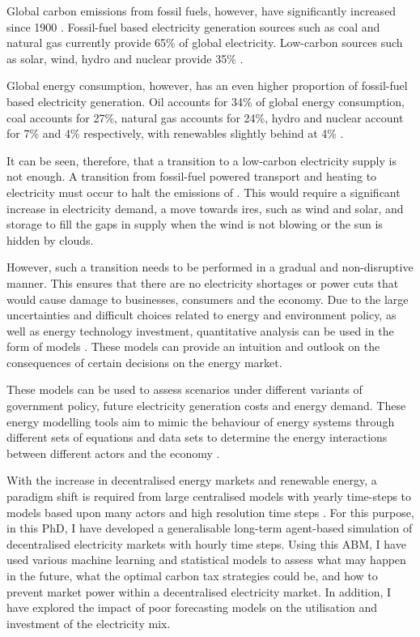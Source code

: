 Global carbon emissions from fossil fuels, however, have significantly increased since 1900 \cite{boden2017global}.    Fossil-fuel based electricity generation sources such as coal and natural gas currently provide 65\% of global electricity. Low-carbon sources such as solar, wind, hydro and nuclear provide 35\% \cite{BP2018}. 

Global energy consumption, however, has an even higher proportion of fossil-fuel based electricity generation. Oil accounts for 34\% of global energy consumption, coal accounts for 27\%, natural gas accounts for 24\%, hydro and nuclear account for 7\% and 4\% respectively, with renewables slightly behind at 4\% \cite{BPReview}. 

It can be seen, therefore, that a transition to a low-carbon electricity supply is not enough. A transition from fossil-fuel powered transport and heating to electricity must occur to halt the emissions of . This would require a significant increase in electricity demand, a move towards \gls{ires}, such as wind and solar, and storage to fill the gaps in supply when the wind is not blowing or the sun is hidden by clouds. 

However, such a transition needs to be performed in a gradual and non-disruptive manner. This ensures that there are no electricity shortages or power cuts that would cause damage to businesses, consumers and the economy. Due to the large uncertainties and difficult choices related to energy and environment policy, as well as energy technology investment, quantitative analysis can be used in the form of models \cite{DeCarolis2012}. These models can provide an intuition and outlook on the consequences of certain decisions on the energy market.

These models can be used to assess scenarios under different variants of government policy, future electricity generation costs and energy demand. These energy modelling tools aim to mimic the behaviour of energy systems through different sets of equations and data sets to determine the energy interactions between different actors and the economy \cite{Machado2019}.

With the increase in decentralised energy markets and renewable energy, a paradigm shift is required from large centralised models with yearly time-steps to models based upon many actors and high resolution time steps \cite{Ringkjob2018, Pfenninger2014b}. For this purpose, in this PhD, I have developed a generalisable long-term agent-based \gls{simulation} of decentralised electricity markets with hourly time steps. Using this \gls{ABM}, I have used various machine learning and statistical models to assess what may happen in the future, what the optimal carbon tax strategies could be, and how to prevent market power within a decentralised electricity market. In addition, I have explored the impact of poor forecasting models on the utilisation and investment of the electricity mix. 

